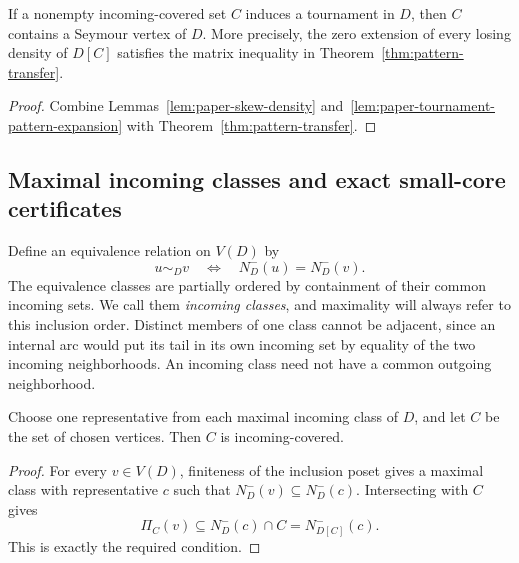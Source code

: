 \begin{corollary}
\label{cor:paper-tournament-core}
If a nonempty incoming-covered set $C$ induces a tournament in $D$, then
$C$ contains a Seymour vertex of $D$. More precisely, the zero extension
of every losing density of $D[C]$ satisfies the matrix inequality in
Theorem~\ref{thm:pattern-transfer}.
\end{corollary}
\begin{proof}
Combine Lemmas~\ref{lem:paper-skew-density}
and~\ref{lem:paper-tournament-pattern-expansion} with
Theorem~\ref{thm:pattern-transfer}.
\end{proof}

\subsection{Maximal incoming classes and exact small-core certificates}

Define an equivalence relation on $V(D)$ by
\[
 u\sim_D v\quad\Longleftrightarrow\quad N_D^-(u)=N_D^-(v).
\]
The equivalence classes are partially ordered by containment of their
common incoming sets. We call them \emph{incoming classes}, and
maximality will always refer to this inclusion order. Distinct members
of one class cannot be adjacent, since an internal arc would put its tail
in its own incoming set by equality of the two incoming neighborhoods.
An incoming class need not have a common outgoing neighborhood.

\begin{lemma}
\label{lem:paper-maximal-representatives-covered}
Choose one representative from each maximal incoming class of $D$, and
let $C$ be the set of chosen vertices. Then $C$ is incoming-covered.
\end{lemma}
\begin{proof}
For every $v\in V(D)$, finiteness of the inclusion poset gives a maximal
class with representative $c$ such that
$N_D^-(v)\subseteq N_D^-(c)$. Intersecting with $C$ gives
\[
 \Pi_C(v)\subseteq N_D^-(c)\cap C=N_{D[C]}^-(c).
\]
This is exactly the required condition.
\end{proof}

